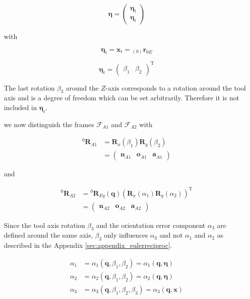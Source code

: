 \documentclass[twocolumn,10pt]{IFTOMM}
\newcommand{\bm}[1]{\boldsymbol{#1}}
\newcommand{\ortvek}[4]{{ }_{(#1)}{\boldsymbol{#2}}^{#3}_{#4} }
\newcommand{\vek}[3]{\boldsymbol{#1}^{#2}_{#3}}
\newcommand{\rotmat}[2]{{{ }^{#1}\boldsymbol{R}}_{#2}}
\newcommand{\transp}[0]{{\mathrm{T}}}
\newcommand{\ks}[1]{{\mathcal{F}}_{#1}}
\begin{document}
\begin{equation}
\bm{\eta}
=
\begin{pmatrix}
\bm{\eta}_{\mathrm{t}} \\
\bm{\eta}_{\mathrm{r}}
\end{pmatrix}
\end{equation}  

with

\begin{equation}
\bm{\eta}_{\mathrm{t}}
=
\bm{x}_{\mathrm{t}}
=
\ortvek{0}{r}{}{0E}
\end{equation}  

\begin{equation}
\bm{\eta}_{\mathrm{r}}
=
\begin{pmatrix}
\beta_1  & \beta_2
\end{pmatrix}^\transp
\end{equation}

The last rotation $\beta_3$ around the $Z$-axis corresponds to a rotation around the tool axis and is a degree of freedom which can be set arbitrarily. Therefore it is not included in $\bm{\eta}_{\mathrm{r}}$.


we now distinguish the frames $\ks{A1}$ and $\ks{A2}$ with


\begin{align}
\rotmat{0}{A1} 
&= 
\bm{R}_x(\beta_1) \bm{R}_y(\beta_2)\\
&=
\begin{pmatrix}
\vek{n}{}{A1} & \vek{o}{}{A1} & \vek{a}{}{A1}
\end{pmatrix} \nonumber
\end{align}


and

\begin{align}
\rotmat{0}{A2} 
&= 
\rotmat{0}{Eq}(\bm{q})
\left(\bm{R}_x(\alpha_1) \bm{R}_y(\alpha_2)\right)^\transp \\ 
&=
\begin{pmatrix}
\vek{n}{}{A2} & \vek{o}{}{A2} & \vek{a}{}{A2}
\end{pmatrix}\nonumber
\end{align}

Since the tool axis rotation $\beta_3$ and the orientation error component $\alpha_3$ are defined around the same axis, $\beta_3$ only influences $\alpha_3$ and not $\alpha_1$ and $\alpha_2$ as described in the Appendix \ref{sec:appendix_eulerreciproc}.

\begin{align}
\alpha_1&=\alpha_1(\bm{q},\beta_1,\beta_2) = \alpha_1(\bm{q},\bm{\eta})\\
\alpha_2&=\alpha_2(\bm{q},\beta_1,\beta_2) = \alpha_2(\bm{q},\bm{\eta}) \\
\alpha_3&=\alpha_3(\bm{q},\beta_1,\beta_2,\beta_3) = \alpha_3(\bm{q},\bm{x})
\end{align}
\end{document}
